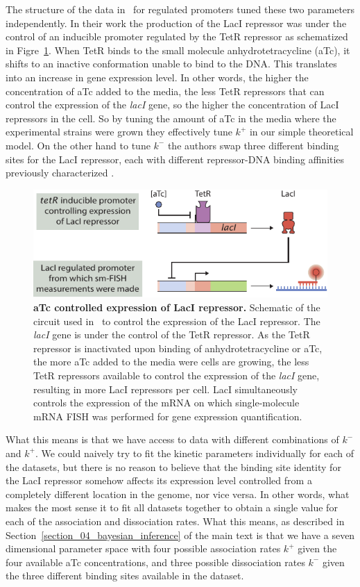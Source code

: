 The structure of the data in~\cite{Jones2014} for regulated promoters tuned
these two parameters independently. In their work the production of the LacI
repressor was under the control of an inducible promoter regulated by the TetR
repressor as schematized in Figre~\ref{figS:aTc_circuit}. When TetR binds to the
small molecule anhydrotetracycline (aTc), it shifts to an inactive conformation
unable to bind to the DNA. This translates into an increase in gene expression
level. In other words, the higher the concentration of aTc added to the media,
the less TetR repressors that can control the expression of the \textit{lacI}
gene, so the higher the concentration of LacI repressors in the cell. So by 
tuning the amount of aTc in the media where the experimental strains were grown
they effectively tune $k^+$ in our simple theoretical model. On the other hand
to tune $k^-$ the authors swap three different binding sites for the LacI 
repressor, each with different repressor-DNA binding affinities previously 
characterized \cite{Garcia2011a}.

\begin{figure}[h!]
\centering
\includegraphics{../figures/si/figS0X_aTc_circuit.pdf}
\caption{\textbf{aTc controlled expression of LacI repressor.} Schematic of the
circuit used in~\cite{Jones2014} to control the expression of the LacI
repressor. The \textit{lacI} gene is under the control of the TetR repressor. As
the TetR repressor is inactivated upon binding of anhydrotetracycline or aTc,
the more aTc added to the media were cells are growing, the less TetR repressors
available to control the expression of the \textit{lacI} gene, resulting in more
LacI repressors per cell. LacI simultaneously controls the expression of the
mRNA on which single-molecule mRNA FISH was performed for gene expression
quantification.}
\label{figS:aTc_circuit}
\end{figure}

What this means is that we have access to data with different combinations of
$k^-$ and $k^+$. We could naively try to fit the kinetic parameters individually
for each of the datasets, but there is no reason to believe that the binding
site identity for the LacI repressor somehow affects its expression level
controlled from a completely different location in the genome, nor vice versa.
In other words, what makes the most sense it to fit all datasets together to
obtain a single value for each of the association and dissociation rates. What
this means, as described in Section~\ref{section_04_bayesian_inference} of the main text
is that we have a seven dimensional parameter space with four possible
association rates $k^+$ given the four available aTc concentrations, and three
possible dissociation rates $k^-$ given the three different binding sites
available in the dataset.

